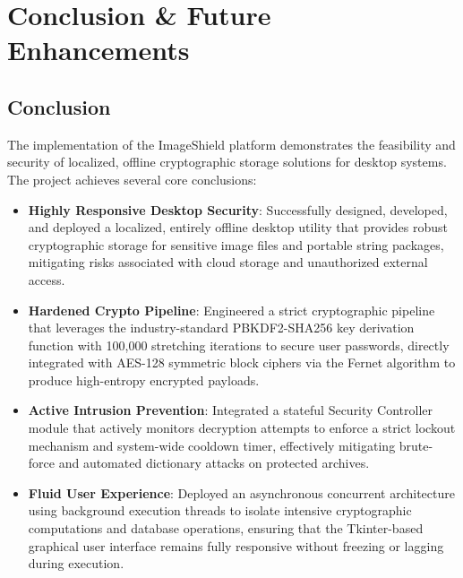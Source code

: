 \documentclass[12pt,a4paper]{report}
\begin{document}
\chapter{Conclusion \& Future Enhancements}

\section{Conclusion}
The implementation of the ImageShield platform demonstrates the feasibility and security of localized, offline cryptographic storage solutions for desktop systems. The project achieves several core conclusions:
\begin{itemize}
    \item \textbf{Highly Responsive Desktop Security}: Successfully designed, developed, and deployed a localized, entirely offline desktop utility that provides robust cryptographic storage for sensitive image files and portable string packages, mitigating risks associated with cloud storage and unauthorized external access.
    \item \textbf{Hardened Crypto Pipeline}: Engineered a strict cryptographic pipeline that leverages the industry-standard PBKDF2-SHA256 key derivation function with 100,000 stretching iterations to secure user passwords, directly integrated with AES-128 symmetric block ciphers via the Fernet algorithm to produce high-entropy encrypted payloads.
    \item \textbf{Active Intrusion Prevention}: Integrated a stateful Security Controller module that actively monitors decryption attempts to enforce a strict lockout mechanism and system-wide cooldown timer, effectively mitigating brute-force and automated dictionary attacks on protected archives.
    \item \textbf{Fluid User Experience}: Deployed an asynchronous concurrent architecture using background execution threads to isolate intensive cryptographic computations and database operations, ensuring that the Tkinter-based graphical user interface remains fully responsive without freezing or lagging during execution.
\end{itemize}
\end{document}
